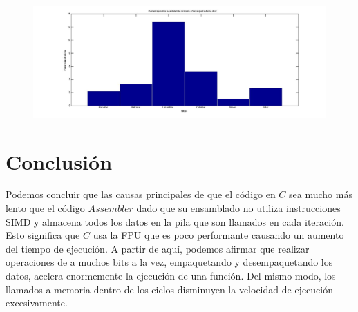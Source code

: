 \documentclass[10pt, a4paper]{article}
\begin{document}
\begin{figure}[H] %
\begin{center}
\includegraphics[width=570pt]{./velocidad.jpg}
\end{center}
\end{figure}
\section{Conclusi\'on}
Podemos concluir que las causas principales de que el código en $C$ sea mucho más lento que el código $Assembler$ dado que su ensamblado no utiliza instrucciones SIMD y almacena todos los datos en la pila que son llamados en cada iteración. Esto significa que $C$ usa la FPU que es poco performante causando un aumento del tiempo de ejecución.\newline
A partir de aquí, podemos afirmar que realizar operaciones de a muchos bits a la vez, empaquetando y desempaquetando los datos, acelera enormemente la ejecución de una función. Del mismo modo, los llamados a memoria dentro de los ciclos disminuyen la velocidad de ejecución excesivamente.
\end{document}
